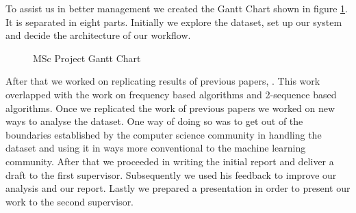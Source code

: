 \documentclass[reqno,openany,12pt]{amsbook}
\begin{document}
To assist us in better management we created the Gantt Chart shown in figure \ref{gantt}. It is separated in eight parts. Initially we explore the dataset, set up our system and decide the architecture of our workflow.
\begin{figure}[h]
\centering
\label{gantt}
\caption{MSc Project Gantt Chart}
\end{figure}
%
%
After that we worked on replicating results of previous papers\cite{adf1}, \cite{adf2}. This work overlapped with the work on frequency based algorithms and 2-sequence based algorithms. Once we replicated the work of previous papers we worked on new ways to analyse the dataset. One way of doing so was to get out of the boundaries established by the computer science community in handling the dataset and using it in ways more conventional to the machine learning community. After that we proceeded in writing the initial report and deliver a draft to the first supervisor. Subsequently we used his feedback to improve our analysis and our report. Lastly we prepared a presentation in order to present our work to the second supervisor.
\end{document}
